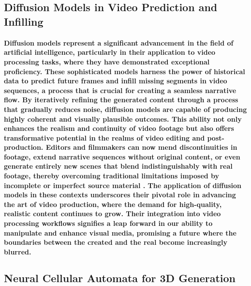 \documentclass[11pt,a4paper,oneside]{report}
\begin{document}
\subsection{Diffusion Models in Video Prediction and Infilling}
\paragraph{Diffusion models represent a significant advancement in the field of artificial intelligence, particularly in their application to video processing tasks, where they have demonstrated exceptional proficiency. These sophisticated models harness the power of historical data to predict future frames and infill missing segments in video sequences, a process that is crucial for creating a seamless narrative flow. By iteratively refining the generated content through a process that gradually reduces noise, diffusion models are capable of producing highly coherent and visually plausible outcomes. This ability not only enhances the realism and continuity of video footage but also offers transformative potential in the realms of video editing and post-production. Editors and filmmakers can now mend discontinuities in footage, extend narrative sequences without original content, or even generate entirely new scenes that blend indistinguishably with real footage, thereby overcoming traditional limitations imposed by incomplete or imperfect source material \cite{hoppe2022diffusion}. The application of diffusion models in these contexts underscores their pivotal role in advancing the art of video production, where the demand for high-quality, realistic content continues to grow. Their integration into video processing workflows signifies a leap forward in our ability to manipulate and enhance visual media, promising a future where the boundaries between the created and the real become increasingly blurred.
}

\subsection{Neural Cellular Automata for 3D Generation}
\end{document}
